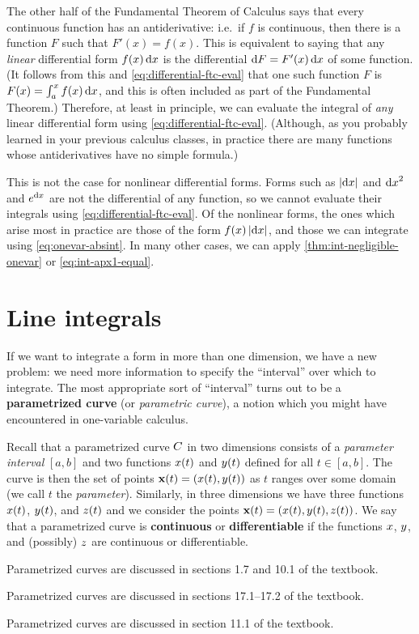 \documentclass[12pt]{amsart}
\begin{document}
The other half of the Fundamental Theorem of Calculus says that every continuous function has an antiderivative: i.e.\ if $f$ is continuous, then there is a function $F$ such that $F'(x) = f(x)$.
This is equivalent to saying that any \emph{linear} differential form $f(x)\,{\mathrm{d} x}$ is the differential $\mathrm{d} F = F'(x)\,{\mathrm{d} x}$ of some function.
(It follows from this and \cref{eq:differential-ftc-eval} that one such function $F$ is $F(x)= \int_a^x f(x)\,{\mathrm{d} x}$, and this is often included as part of the Fundamental Theorem.)
Therefore, at least in principle, we can evaluate the integral of \emph{any} linear differential form using \cref{eq:differential-ftc-eval}.
(Although, as you probably learned in your previous calculus classes, in practice there are many functions whose antiderivatives have no simple formula.)

This is not the case for nonlinear differential forms.
Forms such as $|{\mathrm{d} x}|$ and ${\mathrm{d} x}^2$ and $e^{\mathrm{d} x}$ are not the differential of any function, so we cannot evaluate their integrals using \cref{eq:differential-ftc-eval}.
Of the nonlinear forms, the ones which arise most in practice are those of the form $f(x)\,|{\mathrm{d} x}|$, and those we can integrate using \cref{eq:onevar-absint}.
In many other cases, we can apply \cref{thm:int-negligible-onevar} or \cref{eq:int-apx1-equal}.


\section{Line integrals}
\label{sec:line-integrals}

If we want to integrate a form in more than one dimension, we have a new problem: we need more information to specify the ``interval'' over which to integrate.
The most appropriate sort of ``interval'' turns out to be a \textbf{parametrized curve} (or \emph{parametric curve}), a notion which you might have encountered in one-variable calculus.

Recall that a parametrized curve $C$ in two dimensions consists of a \emph{parameter interval} $[a,b]$ and two functions $x(t)$ and $y(t)$ defined for all $t\in [a,b]$.
The curve is then the set of points $\mathbf{x}(t) = (x(t),y(t))$ as $t$ ranges over some domain (we call $t$ the \emph{parameter}).
Similarly, in three dimensions we have three functions $x(t)$, $y(t)$, and $z(t)$ and we consider the points $\mathbf{x}(t) = (x(t),y(t),z(t))$.
We say that a parametrized curve is \textbf{continuous} or \textbf{differentiable} if the functions $x$, $y$, and (possibly) $z$ are continuous or differentiable.
\begin{stewart}Parametrized curves are discussed in sections 1.7 and 10.1 of the textbook.\end{stewart}%
\begin{hugheshallett}Parametrized curves are discussed in sections 17.1--17.2 of the textbook.\end{hugheshallett}%
\begin{rogawski}Parametrized curves are discussed in section 11.1 of the textbook.\end{rogawski}%
\end{document}
